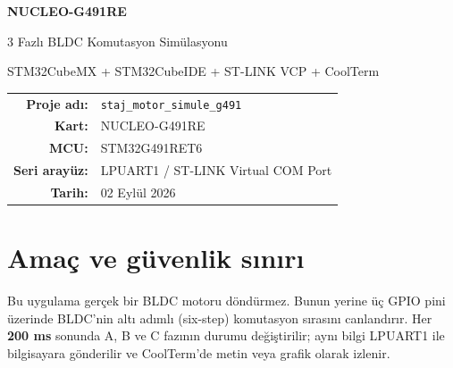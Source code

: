 \documentclass[11pt,a4paper]{article}
\begin{document}
\pagecolor{white}
\color{black}

\begin{titlepage}
  \centering
  \vspace*{2.4cm}
  {\Huge\bfseries\textcolor{stmblue}{NUCLEO-G491RE}\par}
  \vspace{0.35cm}
  {\LARGE 3 Fazlı BLDC Komutasyon Simülasyonu\par}
  \vspace{0.25cm}
  {\Large STM32CubeMX + STM32CubeIDE + ST-LINK VCP + CoolTerm\par}
  \vfill
  \begin{tabular}{rl}
    \textbf{Proje adı:} & \texttt{staj\_motor\_simule\_g491} \\
    \textbf{Kart:} & NUCLEO-G491RE \\
    \textbf{MCU:} & STM32G491RET6 \\
    \textbf{Seri arayüz:} & LPUART1 / ST-LINK Virtual COM Port \\
    \textbf{Tarih:} & 02 Eylül 2026 \\
  \end{tabular}
  \vfill
  \vspace*{1.6cm}
\end{titlepage}

\tableofcontents
\newpage

\section{Amaç ve güvenlik sınırı}

Bu uygulama gerçek bir BLDC motoru döndürmez. Bunun yerine üç GPIO pini üzerinde
BLDC'nin altı adımlı (six-step) komutasyon sırasını canlandırır. Her \textbf{200 ms}
sonunda A, B ve C fazının durumu değiştirilir; aynı bilgi LPUART1 ile bilgisayara
gönderilir ve CoolTerm'de metin veya grafik olarak izlenir.

\begin{center}
\end{center}
\end{document}
